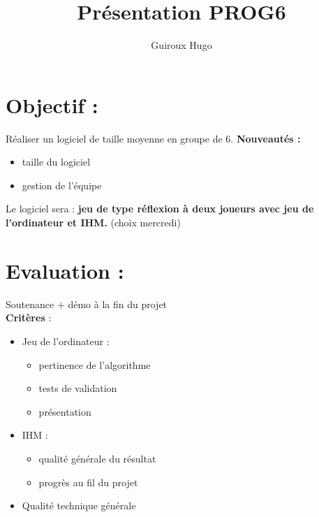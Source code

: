 \documentclass{article}
\title{Présentation PROG6}
\author{Guiroux Hugo}
\let\maketitlebis\maketitle
\renewcommand\maketitle{\maketitlebis \thispagestyle{fancy}}
\begin{document}
\maketitle

\section{Objectif :}
Réaliser un logiciel de taille moyenne en groupe de 6.
\textbf{Nouveautés : } 

\begin{itemize}
\item taille du logiciel
\item gestion de l'équipe
\end{itemize}

Le logiciel sera : \textbf{jeu de type réflexion à deux joueurs avec jeu de l'ordinateur et IHM.} (choix mercredi)
\\
\section{Evaluation :}
Soutenance + démo à la fin du projet
\\
\textbf{Critères} :
\begin{itemize}
\item Jeu de l'ordinateur :
  \begin{itemize}
  \item pertinence de l'algorithme
  \item tests de validation
  \item présentation
  \end{itemize}
\item IHM :
  \begin{itemize}
  \item qualité générale du résultat
  \item progrès au fil du projet
  \end{itemize}
\item Qualité technique générale
\end{itemize}

\newpage
\end{document}
